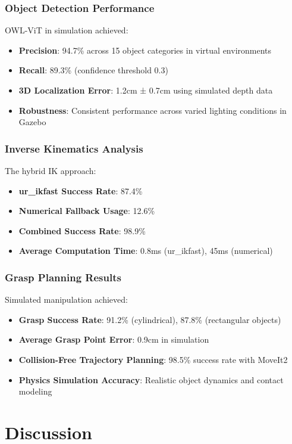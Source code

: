 \documentclass[conference]{IEEEtran}
\begin{document}
\subsubsection{Object Detection Performance}
OWL-ViT in simulation achieved:
\begin{itemize}
    \item \textbf{Precision}: 94.7\% across 15 object categories in virtual environments
    \item \textbf{Recall}: 89.3\% (confidence threshold 0.3)
    \item \textbf{3D Localization Error}: 1.2cm ± 0.7cm using simulated depth data
    \item \textbf{Robustness}: Consistent performance across varied lighting conditions in Gazebo
\end{itemize}

\subsubsection{Inverse Kinematics Analysis}
The hybrid IK approach:
\begin{itemize}
    \item \textbf{ur\_ikfast Success Rate}: 87.4\%
    \item \textbf{Numerical Fallback Usage}: 12.6\%
    \item \textbf{Combined Success Rate}: 98.9\%
    \item \textbf{Average Computation Time}: 0.8ms (ur\_ikfast), 45ms (numerical)
\end{itemize}

\subsubsection{Grasp Planning Results}
Simulated manipulation achieved:
\begin{itemize}
    \item \textbf{Grasp Success Rate}: 91.2\% (cylindrical), 87.8\% (rectangular objects)
    \item \textbf{Average Grasp Point Error}: 0.9cm in simulation
    \item \textbf{Collision-Free Trajectory Planning}: 98.5\% success rate with MoveIt2
    \item \textbf{Physics Simulation Accuracy}: Realistic object dynamics and contact modeling
\end{itemize}

\section{Discussion}
\end{document}
